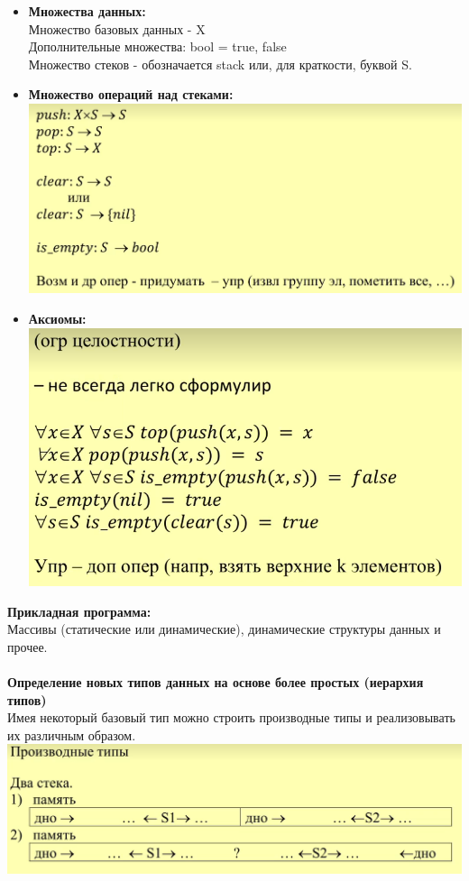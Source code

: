   \begin{itemize}
    \item 
      \textbf{Множества данных:}\\
      Множество базовых данных - X\\
      Дополнительные множества: bool = {true, false}\\
      Множество стеков - обозначается stack или, для краткости, буквой S.
    \item
      \textbf{Множество операций над стеками:}\\ 
      \includegraphics[width=0.7\linewidth]{pictures/5_1.PNG}
    \item
      \textbf{Аксиомы:}\\
      \includegraphics[width=0.7\linewidth]{pictures/5_2.PNG}
  \end{itemize}

  \textbf{Прикладная программа:} \\
   Массивы (статические или динамические), динамические структуры данных и прочее.\\ \\
  
  \textbf{Определение новых типов данных на основе более простых (иерархия типов)}\\
   Имея некоторый базовый тип можно строить производные типы и реализовывать их различным образом.\\
   \includegraphics[width=0.7\linewidth]{pictures/5_3.PNG}\\ \\

